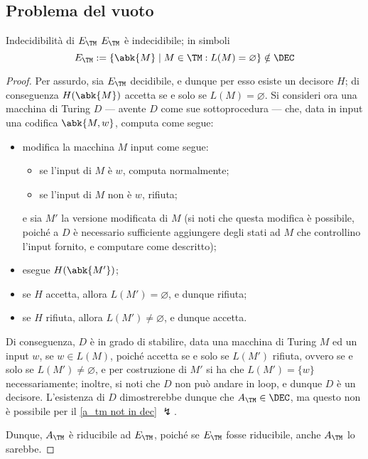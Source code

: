 \documentclass[a4paper, 12pt]{report}
\begin{document}
    \subsection{Problema del vuoto}

    \begin{framedthm}{Indecidibilità di $E_\TM$}
        $E_\TM$ è indecidibile; in simboli $$E_\TM := \{\abk{M} \mid M \in \TM : L(M) = \varnothing \} \notin \DEC$$
    \end{framedthm}

    \begin{proof}
        Per assurdo, sia $E_\TM$ decidibile, e dunque per esso esiste un decisore $H$; di conseguenza $H(\abk{M})$ accetta se e solo se $L(M) = \varnothing$. Si consideri ora una macchina di Turing $D$ --- avente $D$ come sue sottoprocedura --- che, data in input una codifica $\abk{M, w}$, computa come segue:

        \begin{itemize}
            \item modifica la macchina $M$ input come segue:
                \begin{itemize}
                    \item se l'input di $M$ è $w$, computa normalmente;
                    \item se l'input di $M$ non è $w$, rifiuta;
                \end{itemize}
                e sia $M'$ la versione modificata di $M$ (si noti che questa modifica è possibile, poiché a $D$ è necessario sufficiente aggiungere degli stati ad $M$ che controllino l'input fornito, e computare come descritto);
            \item esegue $H(\abk{M'})$;
            \item se $H$ accetta, allora $L(M') = \varnothing$, e dunque rifiuta;
            \item se $H$ rifiuta, allora $L(M') \neq \varnothing$, e dunque accetta.
        \end{itemize}

        Di conseguenza, $D$ è in grado di stabilire, data una macchina di Turing $M$ ed un input $w$, se $w \in L(M)$, poiché accetta se e solo se $L(M')$ rifiuta, ovvero se e solo se $L(M') \neq \varnothing$, e per costruzione di $M'$ si ha che $L(M') = \{ w\}$ necessariamente; inoltre, si noti che $D$ non può andare in loop, e dunque $D$ è un decisore. L'esistenza di $D$ dimostrerebbe dunque che $A_\TM \in \DEC$, ma questo non è possibile per il \cref{a_tm not in dec} $\lightning$.

        Dunque, $A_\TM$ è riducibile ad $E_\TM$, poiché se $E_\TM$ fosse riducibile, anche $A_\TM$ lo sarebbe.
    \end{proof}
\end{document}

